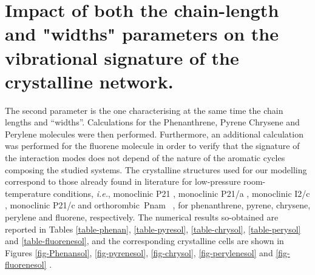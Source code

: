 \section{Impact of both the chain-length and "widths" parameters on the vibrational signature of the crystalline network.}

 	
The second parameter is the one characterising at the same time the chain lengths and “widths”. Calculations for the Phenanthrene, Pyrene Chrysene and Perylene molecules were then performed. Furthermore, an additional calculation was performed for the fluorene molecule in order to verify that the signature of the interaction modes does not depend of the nature of the aromatic cycles composing the studied systems. The crystalline structures used for our modelling correspond to those already found in literature for low-pressure room-temperature conditions, \textit{i.e.}, monoclinic P21 \cite{fabbiani2006exploration}, monoclinic P21/a \cite{fabbiani2006exploration}, monoclinic I2/c \cite{burns1960refinement}, monoclinic P21/c \cite{nather1998solvent} and orthorombic Pnam  \cite{belsky1984fluorene}, for phenanthrene, pyrene, chrysene, perylene and fluorene, respectively. The numerical results so-obtained are reported in Tables \ref{table-phenan}, \ref{table-pyresol}, \ref{table-chrysol}, \ref{table-perysol} and \ref{table-fluorenesol}, and the corresponding crystalline cells are shown in Figures \ref{fig-Phenansol}, \ref{fig-pyrenesol}, \ref{fig-chrysol}, \ref{fig-perylenesol} and \ref{fig-fluorenesol} .
 	

